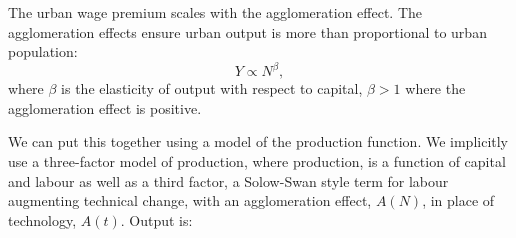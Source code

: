 

The urban wage premium scales with the agglomeration effect. The \glspl{agglomeration effect} ensure urban \gls{output} is more than proportional to urban population: 
 \begin{equation}
 Y\propto N^{\beta},
 \label{eqn-production-population}
 \end{equation}
where $\beta$ is the elasticity of output with respect to capital, $\beta > 1$ where the agglomeration effect is positive. %

We can put this together using a model of the production function. We implicitly use a three-factor model of \gls{production}, where production, is a function of capital and labour as well as a third factor, a Solow-Swan style term for labour augmenting technical change, with an \gls{agglomeration} effect, $A(N)$, in place of technology, $A(t)$. Output is:

